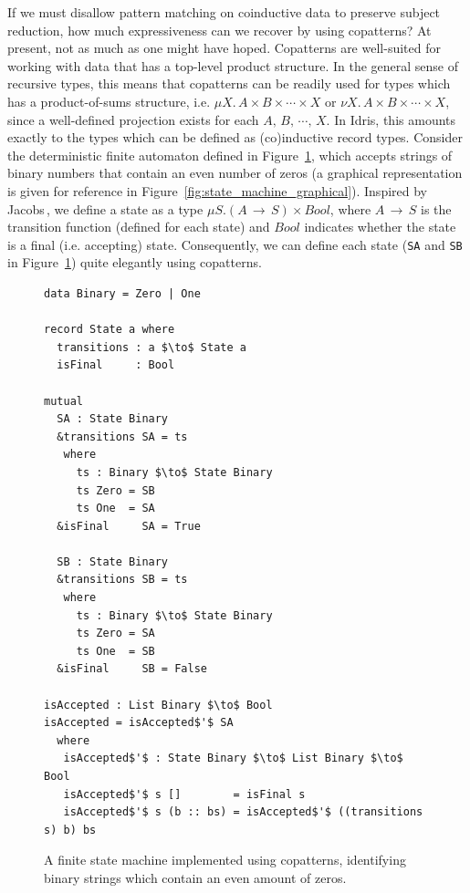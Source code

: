 

\label{sec:prod-vs.-copr}
If we must disallow pattern matching on coinductive data to preserve subject
reduction, how much expressiveness can we recover by using copatterns? At
present, not as much as one might have hoped. Copatterns are well-suited for
working with data that has a top-level product structure. In the general sense
of recursive types, this means that copatterns can be readily used for types
which has a product-of-sums structure, i.e.
${\mu X.\,A\times B\times\cdots\times X}$ or
${\nu X.\,A\times B\times\cdots\times X}$, since a well-defined projection
exists for each $A,\,B,\,\cdots,\,X$. In Idris, this amounts exactly to the
types which can be defined as (co)inductive record types. Consider the
deterministic finite automaton defined in Figure~\ref{fig:state_machine}, which
accepts strings of binary numbers that contain an even number of zeros (a
graphical representation is given for reference in
Figure~\ref{fig:state_machine_graphical}). Inspired by
Jacobs\,\citep{JacobsCoalgebra}, we define a state as a type
${\mu S. (A\,\to\,S)\times Bool}$, where $A\,\to\,S$ is the transition function
(defined for each state) and $Bool$ indicates whether the state is a final
(i.e. accepting) state. Consequently, we can define each state (\texttt{SA} and
\texttt{SB} in Figure~\ref{fig:state_machine}) quite elegantly using copatterns.

\begin{figure}[h]
\begin{lstlisting}[mathescape]
data Binary = Zero | One

record State a where
  transitions : a $\to$ State a 
  isFinal     : Bool

mutual  
  SA : State Binary
  &transitions SA = ts
   where
     ts : Binary $\to$ State Binary
     ts Zero = SB
     ts One  = SA
  &isFinal     SA = True 
  
  SB : State Binary
  &transitions SB = ts
   where
     ts : Binary $\to$ State Binary
     ts Zero = SA 
     ts One  = SB
  &isFinal     SB = False

isAccepted : List Binary $\to$ Bool
isAccepted = isAccepted$'$ SA
  where
   isAccepted$'$ : State Binary $\to$ List Binary $\to$ Bool
   isAccepted$'$ s []        = isFinal s
   isAccepted$'$ s (b :: bs) = isAccepted$'$ ((transitions s) b) bs
\end{lstlisting}
  \caption{A finite state machine implemented using copatterns, identifying
    binary strings which contain an even amount of zeros.}
\label{fig:state_machine}
\end{figure}

